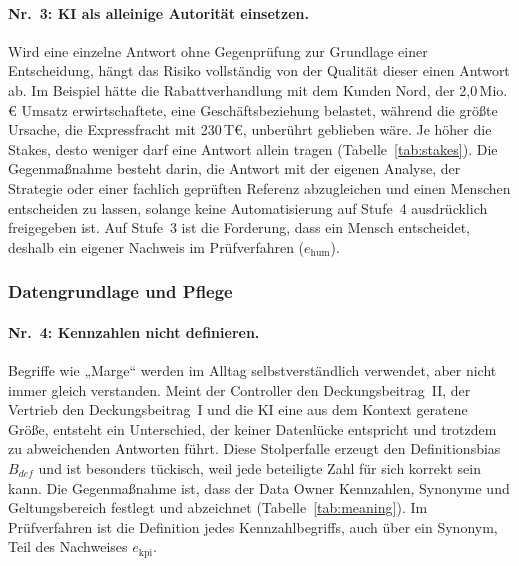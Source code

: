 \documentclass[a4paper,12pt]{article}
\theoremstyle{definition}
\begin{document}
\paragraph{Nr.~3: KI als alleinige Autorität einsetzen.}
Wird eine einzelne Antwort ohne Gegenprüfung zur Grundlage einer Entscheidung, hängt das Risiko vollständig von der Qualität dieser einen Antwort ab. Im Beispiel hätte die Rabattverhandlung mit dem Kunden Nord, der 2{,}0\,Mio.\,€ Umsatz erwirtschaftete, eine Geschäftsbeziehung belastet, während die größte Ursache, die Expressfracht mit 230\,T€, unberührt geblieben wäre. Je höher die Stakes, desto weniger darf eine Antwort allein tragen (Tabelle~\ref{tab:stakes}). Die Gegenmaßnahme besteht darin, die Antwort mit der eigenen Analyse, der Strategie oder einer fachlich geprüften Referenz abzugleichen und einen Menschen entscheiden zu lassen, solange keine Automatisierung auf Stufe~4 ausdrücklich freigegeben ist. Auf Stufe~3 ist die Forderung, dass ein Mensch entscheidet, deshalb ein eigener Nachweis im Prüfverfahren ($e_{\mathrm{hum}}$).

\subsubsection{Datengrundlage und Pflege}

\paragraph{Nr.~4: Kennzahlen nicht definieren.}
Begriffe wie „Marge“ werden im Alltag selbstverständlich verwendet, aber nicht immer gleich verstanden. Meint der Controller den Deckungsbeitrag~II, der Vertrieb den Deckungsbeitrag~I und die KI eine aus dem Kontext geratene Größe, entsteht ein Unterschied, der keiner Datenlücke entspricht und trotzdem zu abweichenden Antworten führt. Diese Stolperfalle erzeugt den Definitionsbias $B_{def}$ und ist besonders tückisch, weil jede beteiligte Zahl für sich korrekt sein kann. Die Gegenmaßnahme ist, dass der Data Owner Kennzahlen, Synonyme und Geltungsbereich festlegt und abzeichnet (Tabelle~\ref{tab:meaning}). Im Prüfverfahren ist die Definition jedes Kennzahlbegriffs, auch über ein Synonym, Teil des Nachweises $e_{\mathrm{kpi}}$.
\end{document}
